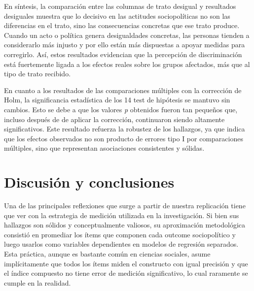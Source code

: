 \documentclass[
  13pt,
  a4paper,
]{article}
\begin{document}
En síntesis, la comparación entre las columnas de trato desigual y resultados desiguales muestra que lo decisivo en las actitudes sociopolíticas no son las diferencias en el trato, sino las consecuencias concretas que ese trato produce. Cuando un acto o política genera desigualdades concretas, las personas tienden a considerarlo más injusto y por ello están más dispuestas a apoyar medidas para corregirlo. Así, estos resultados evidencian que la percepción de discriminación está fuertemente ligada a los efectos reales sobre los grupos afectados, más que al tipo de trato recibido.

En cuanto a los resultados de las comparaciones múltiples con la corrección de Holm, la significancia estadística de los 14 test de hipótesis se mantuvo sin cambios. Esto se debe a que los valores \emph{p} obtenidos fueron tan pequeños que, incluso después de de aplicar la corrección, continuaron siendo altamente significativos. Este resultado refuerza la robustez de los hallazgos, ya que indica que los efectos observados no son producto de errores tipo I por comparaciones múltiples, sino que representan asociaciones consistentes y sólidas.

\hypertarget{discusiuxf3n-y-conclusiones}{%
\section{Discusión y conclusiones}\label{discusiuxf3n-y-conclusiones}}

Una de las principales reflexiones que surge a partir de nuestra replicación tiene que ver con la estrategia de medición utilizada en la investigación. Si bien sus hallazgos son sólidos y conceptualmente valiosos, su aproximación metodológica consistió en promediar los ítems que componen cada outcome sociopolítico y luego usarlos como variables dependientes en modelos de regresión separados. Esta práctica, aunque es bastante común en ciencias sociales, asume implícitamente que todos los ítems miden el constructo con igual precisión y que el índice compuesto no tiene error de medición significativo, lo cual raramente se cumple en la realidad.
\end{document}
